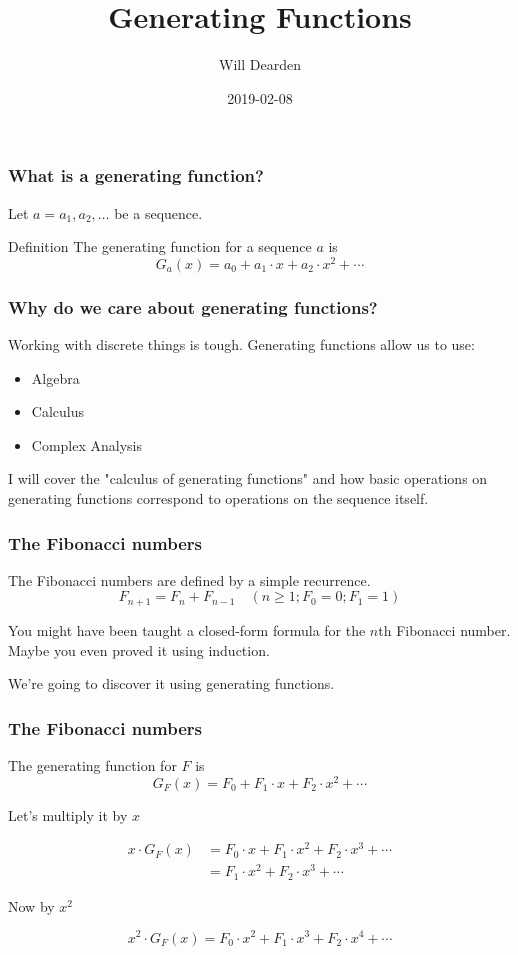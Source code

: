 \documentclass{beamer}
\title{Generating Functions}
\author{Will Dearden}
\institute{Uptake}
\date{2019-02-08}
\begin{document}
 
\frame{\titlepage}
 
\begin{frame}
    \frametitle{What is a generating function?}
    Let $a = a_1, a_2, \ldots $ be a sequence.

    \begin{block}{Definition}
        The generating function for a sequence $a$ is $$G_a(x) = a_0 + a_1 \cdot x + a_2 \cdot x^2 + \cdots$$
    \end{block}
\end{frame}

\begin{frame}
    \frametitle{Why do we care about generating functions?}
    Working with discrete things is tough.
    \pause
    \newline
    \newline
    Generating functions allow us to use:
    \begin{itemize}
        \item Algebra
        \item Calculus
        \item Complex Analysis
    \end{itemize}

    \pause
    \quad
    \newline
    I will cover the "calculus of generating functions" and how basic operations on generating functions correspond to operations on the sequence itself.
\end{frame}

\begin{frame}
    \frametitle{The Fibonacci numbers}

    The Fibonacci numbers are defined by a simple recurrence.
    $$F_{n + 1} = F_n + F_{n-1} \quad \left(n \geq 1;F_0 = 0;F_1 = 1\right)$$

    \pause

    You might have been taught a closed-form formula for the $n$th Fibonacci number. Maybe you even proved it using induction.

    \pause
    We're going to discover it using generating functions.
\end{frame}

\begin{frame}
    \frametitle{The Fibonacci numbers}

    The generating function for $F$ is $$G_F(x) = F_0 + F_1 \cdot x + F_2 \cdot x^2 + \cdots$$

    \pause

    Let's multiply it by $x$

    \pause

    \begin{align*}
        x \cdot G_F(x) &= F_0\cdot x + F_1 \cdot x^2 + F_2 \cdot x^3 + \cdots \\
        &= F_1 \cdot x^2 + F_2 \cdot x^3 + \cdots 
    \end{align*}

    \pause

    Now by $x^2$

    \pause

    $$x^2 \cdot G_F(x) = F_0\cdot x^2 + F_1 \cdot x^3 + F_2 \cdot x^4 + \cdots$$
\end{frame}
\end{document}
